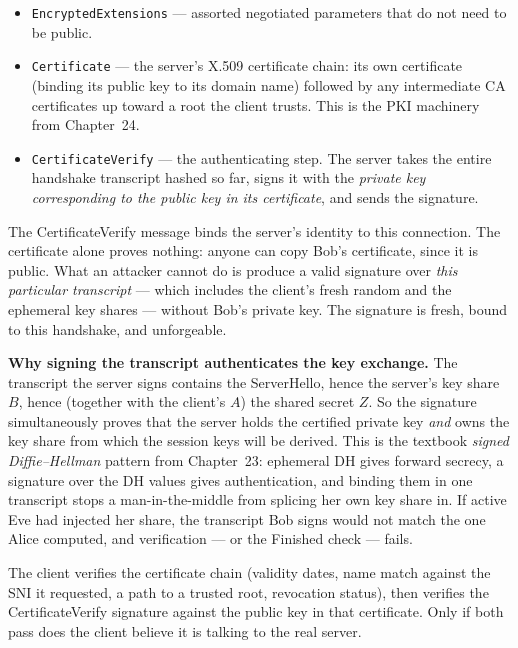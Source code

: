 \begin{itemize}
\item \texttt{EncryptedExtensions} --- assorted negotiated parameters that do not
need to be public.
\item \texttt{Certificate} --- the server's X.509 certificate chain: its own
certificate (binding its public key to its domain name) followed by any
intermediate CA certificates up toward a root the client trusts. This is the PKI
machinery from Chapter~24.
\item \texttt{CertificateVerify} --- the authenticating step. The server takes the entire
handshake transcript hashed so far, signs it with the \emph{private key
corresponding to the public key in its certificate}, and sends the signature.
\end{itemize}

The CertificateVerify message binds the server's identity to this connection. The
certificate alone proves nothing: anyone can copy Bob's certificate, since it is
public. What an attacker cannot do is produce a valid signature over
\emph{this particular transcript} --- which includes the client's fresh random and
the ephemeral key shares --- without Bob's private key. The signature is fresh,
bound to this handshake, and unforgeable.

\begin{whybox}
\textbf{Why signing the transcript authenticates the key exchange.} The transcript
the server signs contains the ServerHello, hence the server's key share $B$, hence
(together with the client's $A$) the shared secret $Z$. So the signature
simultaneously proves that the server holds the certified private key \emph{and}
owns the key share from which the session keys will be derived.
This is the textbook \emph{signed Diffie--Hellman} pattern from
Chapter~23: ephemeral DH gives forward secrecy, a signature over the DH
values gives authentication, and binding them in one transcript stops a
man-in-the-middle from splicing her own key share in. If active Eve had injected
her share, the transcript Bob signs would not match the one Alice computed, and
verification --- or the Finished check --- fails.
\end{whybox}

The client verifies the certificate chain (validity dates, name match against the
SNI it requested, a path to a trusted root, revocation status), then verifies the
CertificateVerify signature against the public key in that certificate. Only if
both pass does the client believe it is talking to the real server.

